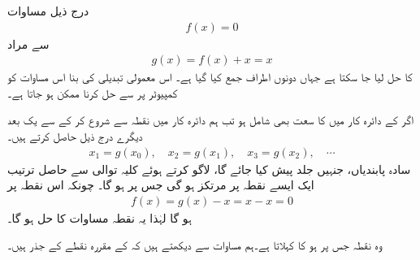 درج ذیل مساوات
\begin{align}\label{مساوات_ترتیب_پکاغ_الف}
f(x)=0
\end{align}
سے مراد 
\begin{align}\label{مساوات_ترتیب_پکاغ_ب}
g(x)=f(x)+x=x
\end{align}
کا حل لیا جا سکتا ہے جہاں دونوں اطراف  جمع کیا گیا ہے۔ اس معمولی تبدیلی کی بنا اس مساوات کو کمپیوٹر پر    سے حل کرنا ممکن ہو جاتا ہے۔

اگر  کے دائرہ کار میں  کا سعت بھی شامل ہو تب ہم دائرہ کار میں نقطہ  سے شروع کر کے  سے یک بعد دیگرے  درج ذیل حاصل کرتے ہیں۔
\begin{align}\label{مساوات_ترتیب_پکاغ_پ}
x_1=g(x_0),\quad x_2=g(x_1),\quad x_3=g(x_2),\quad \cdots
\end{align} 
سادہ پابندیاں، جنہیں جلد پیش کیا جائے گا، لاگو کرتے ہوئے کلیہ توالی  سے حاصل ترتیب ایک ایسے نقطہ  پر مرتکز ہو گی جس پر  ہو گا۔ چونکہ اس نقطہ پر
\begin{align}\label{مساوات_ترتیب_پکاغ_ت}
f(x)=g(x)-x=x-x=0
\end{align}
ہو گا لہٰذا یہ نقطہ مساوات  کا حل ہو گا۔

وہ نقطہ جس پر  ہو  کا  کہلاتا ہے۔ہم مساوات  سے دیکھتے ہیں کہ  کے مقررہ نقطے  کے جذر ہیں۔

